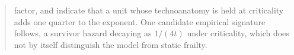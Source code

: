 \begin{abstract}
factor, and indicate that a unit whose technoanatomy is held at criticality adds one quarter to the exponent. One candidate empirical signature follows, a survivor hazard decaying as $1/(4t)$ under criticality, which does not by itself distinguish the model from static frailty.

\end{abstract}
